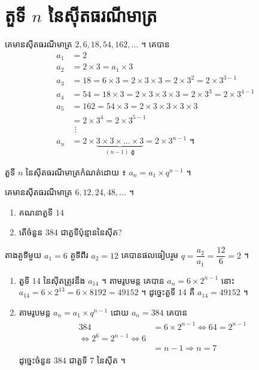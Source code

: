 \section{តួទី \texorpdfstring{$n$}{n} នៃស៊ីតធរណីមាត្រ}

\begin{example}[ឧទាហរណ៍]
គេមានស៊ីតធរណីមាត្រ $2, 6, 18, 54, 162, \ldots$ ។ គេបាន
\[
\begin{aligned}
a_1 &= 2\\
a_2 &= 2 \times 3 = a_1 \times 3\\
a_3 &= 18 = 6 \times 3 = 2 \times 3 \times 3 = 2 \times 3^2 = 2 \times 3^{3-1}\\
a_4 &= 54 = 18 \times 3 = 2 \times 3 \times 3 \times 3 = 2 \times 3^3 = 2 \times 3^{4-1}\\
a_5 &= 162 = 54 \times 3 = 2 \times 3 \times 3 \times 3 \times 3\\
&= 2 \times 3^4 = 2 \times 3^{5-1}\\
&\ \,\vdots\\
a_n &= 2 \times \underbrace{3 \times 3 \times \ldots \times 3}_{(n-1) \text{ តួ}} = 2 \times 3^{n-1} \text{ ។}
\end{aligned}
\]
\end{example}

\begin{formulaBox}[ជាទូទៅ]
តួទី $n$ នៃស៊ីតធរណីមាត្រកំណត់ដោយ ៖ $a_n = a_1 \times q^{n-1}$ ។
\end{formulaBox}

\begin{example}[លំហាត់គំរូ ១]
គេមានស៊ីតធរណីមាត្រ $6, 12, 24, 48, \ldots$ ។
\begin{enumerate}[a]
  \item គណនាតួទី $14$
  \item តើចំនួន $384$ ជាតួទីប៉ុន្មាននៃស៊ីត?
\end{enumerate}
\end{example}
\ans
តាងតួទីមួយ $a_1 = 6$ តួទីពីរ $a_2 = 12$ គេបានផលធៀបរួម $q = \dfrac{a_2}{a_1} = \dfrac{12}{6} = 2$ ។
\begin{enumerate}[a]
  \item តួទី $14$ នៃស៊ីតត្រូវនឹង $a_{14}$ ។ តាមរូបមន្ត គេបាន $a_n = 6 \times 2^{n-1}$ នោះ $a_{14} = 6 \times 2^{13} = 6 \times 8192 = 49152$ ។ ដូច្នេះតួទី $14$ គឺ $a_{14} = 49152$ ។
  \item តាមរូបមន្ត $a_n = a_1 \times q^{n-1}$ ដោយ $a_n = 384$ គេបាន
  \[
\begin{gathered}
\begin{aligned}
384 &= 6 \times 2^{n-1} \iff 64 = 2^{n-1}\\ \iff 2^6 = 2^{n-1} \iff 6\\
&= n - 1 \Rightarrow n = 7
\end{aligned}
\end{gathered}
\]
  ដូច្នេះចំនួន $384$ ជាតួទី $7$ នៃស៊ីត ។
\end{enumerate}

